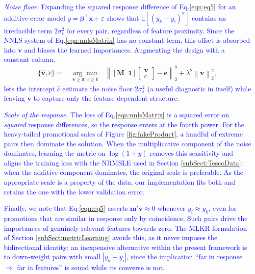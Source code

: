 \documentclass{ieeeaccess}
\newcommand{\myblue}[1]{\textcolor{blue}{#1}}
\newcommand\norm[1]{\left\lVert#1\right\rVert}
\begin{document}
\myblue{\emph{Noise floor.} Expanding the squared response difference of
Eq.\eqref{eqn:eq5} for an additive-error model $y = \boldsymbol{\beta}^\top
\mathbf{x} + \varepsilon$ shows that $\mathbb{E}\!\left[(y_k - y_i)^2\right]$
contains an irreducible term $2\sigma_\varepsilon^2$ for every pair, regardless
of feature proximity. Since the NNLS system of Eq.\eqref{eqn:nnlsMatrix} has no
constant term, this offset is absorbed into $\mathbf{v}$ and biases the learned
importances. Augmenting the design with a constant column,}
\begin{equation}
\begin{aligned}
\{\hat{\mathbf{v}}, \hat{c}\} =~ & \underset{\mathbf{v} \geq \mathbf{0},\, c \geq 0}{\arg\min}
& \norm{ \left[\mathbf{M} \;\; \mathbf{1}\right] \begin{bmatrix} \mathbf{v} \\ c \end{bmatrix} - \mathbf{e} }_2^2 + \lambda^2 \norm{ \mathbf{v} }_2^2 ,
\end{aligned}
\label{eqn:nnlsIntercept}
\end{equation}
\myblue{lets the intercept $\hat{c}$ estimate the noise floor $2\sigma_\varepsilon^2$
(a useful diagnostic in itself) while leaving $\mathbf{v}$ to capture only the
feature-dependent structure.}

\myblue{\emph{Scale of the response.} The loss of Eq.\eqref{eqn:nnlsMatrix} is a
squared error on \emph{squared} response differences, so the response enters at
the fourth power. For the heavy-tailed promotional sales of
Figure \ref{fig:fakeProduct}, a handful of extreme pairs then dominate the
solution. When the multiplicative component of the noise dominates, learning the
metric on $\log(1+y)$ removes this sensitivity and aligns the training loss with
the NRMSLE used in Section \ref{subSect:TescoData}; when the additive component
dominates, the original scale is preferable. As the appropriate scale is a
property of the data, our implementation fits both and retains the one with the
lower validation error.}

\myblue{Finally, we note that Eq.\eqref{eqn:eq5} asserts $\mathbf{m}^i\mathbf{v}
\approx 0$ whenever $y_i \approx y_k$, even for promotions that are similar in
response only by coincidence. Such pairs drive the importances of genuinely
relevant features towards zero. The MLKR formulation of
Section \ref{subSect:metricLearning} avoids this, as it never imposes the
bidirectional identity; an inexpensive alternative within the present framework
is to down-weight pairs with small $|y_k - y_i|$, since the implication
``far in response $\Rightarrow$ far in features'' is sound while its converse is
not.}
\end{document}
